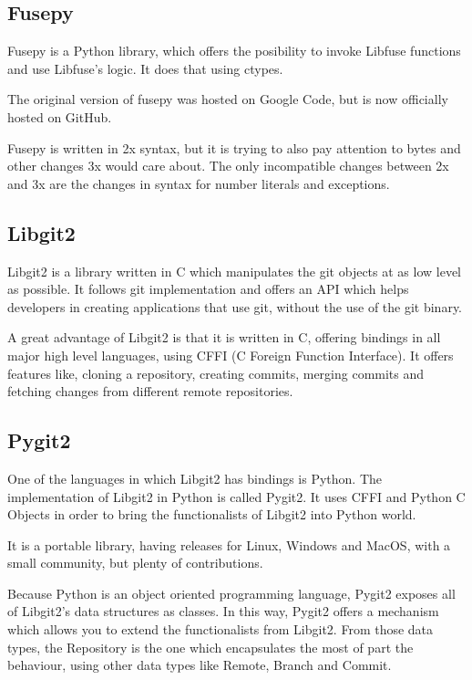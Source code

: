     \subsection{Fusepy}
        Fusepy is a Python library, which offers the posibility to invoke Libfuse functions and use Libfuse's logic. It does that using ctypes.

        The original version of fusepy was hosted on Google Code, but is now officially hosted on GitHub.

        Fusepy is written in 2x syntax, but it is trying to also pay attention to bytes and other changes 3x would care about. The only incompatible changes between 2x and 3x are the changes in syntax for number literals and exceptions.
    \subsection{Libgit2}
        Libgit2 is a library written in C which manipulates the git objects at as low level as possible. It follows git implementation and offers an API which helps developers in creating applications that use git, without the use of the git binary.

        A great advantage of Libgit2 is that it is written in C, offering bindings in all major high level languages, using CFFI (C Foreign Function Interface). It offers features like, cloning a repository, creating commits, merging commits and fetching changes from different remote repositories.

    \subsection{Pygit2}
        One of the languages in which Libgit2 has bindings is Python. The implementation of Libgit2 in Python is called Pygit2. It uses CFFI and Python C Objects in order to bring the functionalists of Libgit2 into Python world.

        It is a portable library, having releases for Linux, Windows and MacOS, with a small community, but plenty of contributions.

        Because Python is an object oriented programming language, Pygit2 exposes all of Libgit2's data structures as classes. In this way, Pygit2 offers a mechanism which allows you to extend the functionalists from Libgit2. From those data types, the Repository is the one which encapsulates the most of part the behaviour, using other data types like Remote, Branch and Commit.

